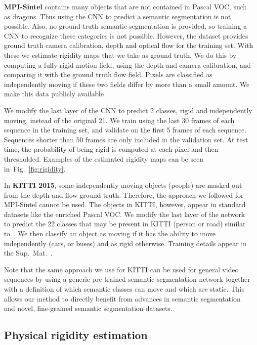 \documentclass[10pt,twocolumn,letterpaper]{article}
\newcommand{\Fig}{Fig.}
\begin{document}
{\bf MPI-Sintel} contains many objects that are not contained in Pascal VOC, such as dragons. Thus using the CNN to predict a semantic segmentation is not possible. Also, no ground truth semantic segmentation is provided, so training a CNN to recognize these categories is not possible. However, the dataset provides ground truth camera calibration, depth and optical flow for the training set. With these we estimate rigidity maps that we take as ground truth. We do this by computing a fully rigid motion field, using the depth and camera calibration, and comparing it with the ground truth flow field. 
Pixels are classified as independently moving if these two fields differ by more than a small amount.
We make this data publicly available \cite{MRFlow:Website}.

We modify the last layer of the CNN to predict 2 classes, rigid and independently moving, instead of the original 21. We train using the last 30 frames of each sequence in the training set, and validate on the first 5 frames of each sequence. Sequences shorter than 50 frames are only included in the validation set. At test time, the probability of being rigid is computed at each pixel and then thresholded. Examples of the estimated rigidity maps can be seen in~\Fig~\ref{fig:rigidity}. 


In {\bf KITTI 2015}, some independently moving objects (\eg people) are masked out from the depth and flow ground truth.
Therefore, the approach we followed for MPI-Sintel cannot be used.
The objects in KITTI, however, appear in standard datasets like the enriched Pascal VOC. 
We modify the last layer of the network to predict the 22 classes that may be present in KITTI (\eg person or road) similar to~\cite{Sevilla:SOF}. 
We then classify an object as moving if it has the ability to move independently (\eg cars, or buses) and as rigid otherwise. 
Training details appear in the Sup.~Mat.~\cite{MRFlow:Website}.

Note that the same approach we use for KITTI can be used for general video sequences by using a generic pre-trained semantic segmentation network together with a definition of which semantic classes can move and which are static.
This allows our method to directly benefit from advances in semantic segmentation and novel, fine-grained semantic segmentation datasets.





 \subsection{Physical rigidity estimation}
\end{document}

